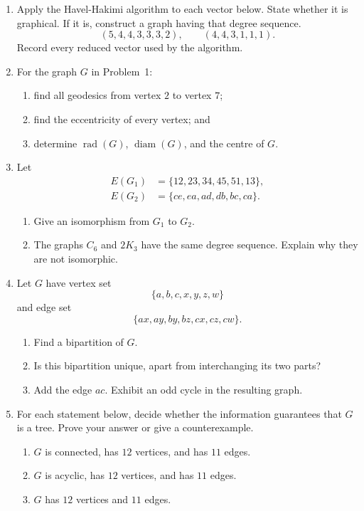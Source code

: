 \documentclass[svgnames]{amsart}
\newcommand{\diam}{\operatorname{diam}}
\newcommand{\rad}{\operatorname{rad}}
\begin{document}
\begin{enumerate}
\item Apply the Havel-Hakimi algorithm to each vector below. State
whether it is graphical. If it is, construct a graph having that degree
sequence.
\begin{equation*}
 (5,4,4,3,3,3,2),
 \qquad
 (4,4,3,1,1,1).
\end{equation*}
Record every reduced vector used by the algorithm.

\item For the graph $G$ in Problem~1:
\begin{enumerate}
  \item find all geodesics from vertex $2$ to vertex $7$;
  \item find the eccentricity of every vertex; and
  \item determine $\rad(G)$, $\diam(G)$, and the centre of $G$.
\end{enumerate}

\item Let
\begin{equation*}
\begin{aligned}
E(G_1)&=\{12,23,34,45,51,13\},\\
E(G_2)&=\{ce,ea,ad,db,bc,ca\}.
\end{aligned}
\end{equation*}
\begin{enumerate}
  \item Give an isomorphism from $G_1$ to $G_2$.
  \item The graphs $C_6$ and $2K_3$ have the same degree sequence.
  Explain why they are not isomorphic.
\end{enumerate}

\item Let $G$ have vertex set
\begin{equation*}
 \{a,b,c,x,y,z,w\}
\end{equation*}
and edge set
\begin{equation*}
 \{ax,ay,by,bz,cx,cz,cw\}.
\end{equation*}
\begin{enumerate}
  \item Find a bipartition of $G$.
  \item Is this bipartition unique, apart from interchanging its two parts?
  \item Add the edge $ac$. Exhibit an odd cycle in the resulting graph.
\end{enumerate}

\item For each statement below, decide whether the information guarantees
that $G$ is a tree. Prove your answer or give a counterexample.
\begin{enumerate}
  \item $G$ is connected, has $12$ vertices, and has $11$ edges.
  \item $G$ is acyclic, has $12$ vertices, and has $11$ edges.
  \item $G$ has $12$ vertices and $11$ edges.
\end{enumerate}


\end{enumerate}
\end{document}
